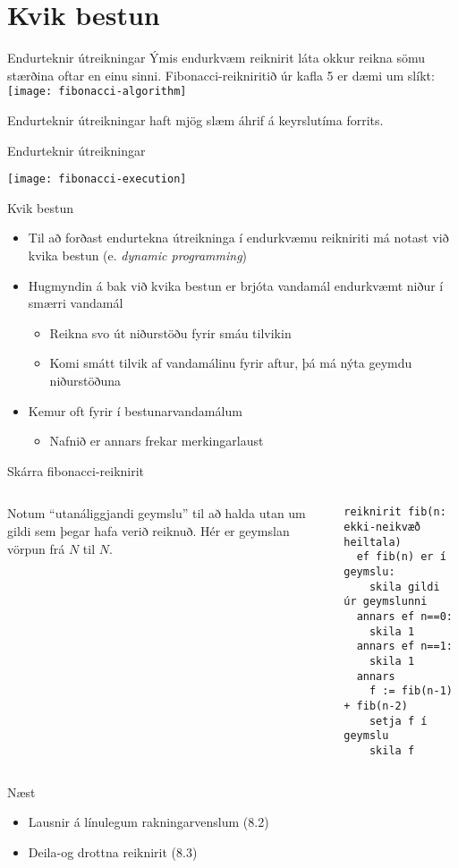 \documentclass[handout]{beamer}
\begin{document}
\section{Kvik bestun}

\begin{frame}{Endurteknir útreikningar}
Ýmis endurkvæm reiknirit láta okkur reikna sömu stærðina oftar en einu sinni. Fibonacci-reikniritið úr kafla 5 er dæmi um slíkt:
\texttt{[image: fibonacci-algorithm]}

Endurteknir útreikningar haft mjög slæm áhrif á keyrslutíma forrits.
\end{frame}

\begin{frame}{Endurteknir útreikningar}
\begin{center}
\texttt{[image: fibonacci-execution]}
\end{center}
\end{frame}

\begin{frame}{Kvik bestun}
\begin{itemize}
 \item Til að forðast endurtekna útreikninga í endurkvæmu reikniriti má notast við kvika bestun (e. \emph{dynamic programming})
 \item Hugmyndin á bak við kvika bestun er brjóta vandamál endurkvæmt niður í smærri vandamál
 \begin{itemize}
  \item Reikna svo út niðurstöðu fyrir smáu tilvikin
  \item Komi smátt tilvik af vandamálinu fyrir aftur, þá má nýta geymdu niðurstöðuna
 \end{itemize}
 \item Kemur oft fyrir í bestunarvandamálum
 \begin{itemize}
  \item Nafnið er annars frekar merkingarlaust
 \end{itemize}
\end{itemize}
\end{frame}

\begin{frame}[fragile]{Skárra fibonacci-reiknirit}
\begin{columns}
Notum ``utanáliggjandi geymslu'' til að halda utan um gildi sem þegar hafa verið reiknuð. Hér er geymslan vörpun frá $N$ til $N$.
\begin{verbatim}
reiknirit fib(n: ekki-neikvæð heiltala)
  ef fib(n) er í geymslu:
    skila gildi úr geymslunni
  annars ef n==0:
    skila 1
  annars ef n==1:
    skila 1
  annars
    f := fib(n-1) + fib(n-2)
    setja f í geymslu
    skila f
\end{verbatim}
\end{columns}
\end{frame}

\begin{frame}{Næst}
\begin{itemize}
 \item Lausnir á línulegum rakningarvenslum (8.2)
 \item Deila-og drottna reiknirit (8.3)
\end{itemize}

\end{frame}
\end{document}
